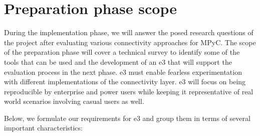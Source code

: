\hypertarget{preparation-phase-scope}{%
\section{Preparation phase scope}\label{preparation-phase-scope}}

During the implementation phase, we will answer the posed research
questions of the project after evaluating various connectivity
approaches for MPyC. The scope of the preparation phase will cover a
technical survey to identify some of the tools that can be used and the
development of an \gls{e3} that will support the evaluation process in
the next phase. \gls{e3} must enable fearless experimentation with
different implementations of the connectivity layer. \gls{e3} will focus
on being reproducible by enterprise and power users while keeping it
representative of real world scenarios involving casual users as well.

Below, we formulate our requirements for \gls{e3} and group them in
terms of several important characteristics:

